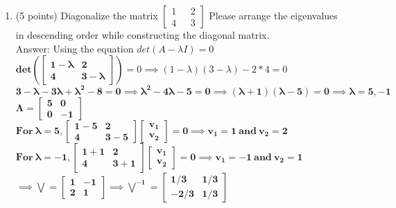 \documentclass{article}%
\begin{document}
\begin{enumerate}
    \setcounter{enumi}{0}
    \item (5 points) Diagonalize the matrix 
    $\begin{bmatrix}
        1 \ \ \ & 2\\
        4 \ \ \ & 3
    \end{bmatrix}$
    Please arrange the eigenvalues in descending order while constructing the diagonal matrix. \\

    Answer: Using the equation $det (A - \lambda I) = 0$ \\
    $\mathbf{ det(\begin{bmatrix}
        1 - \lambda & 2 \\
        4 & 3 - \lambda
    \end{bmatrix}) } = 0 \implies (1 - \lambda)(3 - \lambda) - 2 * 4 = 0$ \\
    $\mathbf{ 3 - \lambda - 3 \lambda + \lambda^2 - 8 = 0 \implies \lambda^2 -4 \lambda - 5 = 0 \implies (\lambda + 1)(\lambda - 5) = 0 \implies \lambda = 5, -1}$ \\
    $\mathbf{ \Lambda = \begin{bmatrix} 5 & 0 \\ 0 & -1 \end{bmatrix} }$ \\
    $\mathbf{ For \ \lambda = 5, \begin{bmatrix} 1 - 5 & 2 \\ 4 & 3 - 5 \end{bmatrix} \begin{bmatrix} v_1 \\ v_2 \end{bmatrix} = 0 \implies v_1 = 1 \ and \ v_2 = 2 }$ \\
    $\mathbf{ For \ \lambda = -1, \begin{bmatrix} 1 + 1 & 2 \\ 4 & 3 + 1 \end{bmatrix} \begin{bmatrix} v_1 \\ v_2 \end{bmatrix} = 0 \implies v_1 = -1 \ and \ v_2 = 1 }$ \\
    $\mathbf{ \implies \bigvee = \begin{bmatrix} 1 & -1 \\ 2 & 1 \end{bmatrix} \implies \bigvee^{-1} = \begin{bmatrix} 1/3 & 1/3 \\ -2/3 & 1/3 \end{bmatrix}}$ \\

\end{enumerate}
\end{document}
